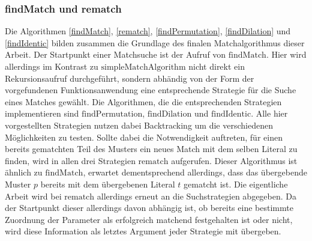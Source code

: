 \subsubsection{findMatch und rematch}
Die Algorithmen \ref{findMatch}, \ref{rematch}, \ref{findPermutation}, \ref{findDilation} und \ref{findIdentic} bilden zusammen die Grundlage des finalen Matchalgorithmus dieser Arbeit. Der Startpunkt einer Matchsuche ist der Aufruf von $\mathrm{findMatch}$. Hier wird allerdings im Kontrast zu $\mathrm{simpleMatchAlgorithm}$ nicht direkt ein Rekursionsaufruf durchgeführt, sondern abhändig von der Form der vorgefundenen Funktionsanwendung eine entsprechende Strategie für die Suche eines Matches gewählt. Die Algorithmen, die die entsprechenden Strategien implementieren sind $\mathrm{findPermutation}$, $\mathrm{findDilation}$ und $\mathrm{findIdentic}$. Alle hier vorgestellten Strategien nutzen dabei Backtracking um die verschiedenen Möglichkeiten zu testen. Sollte dabei die Notwendigkeit auftreten, für einen bereits gematchten Teil des Musters ein neues Match mit dem selben Literal zu finden, wird in allen drei Strategien $\mathrm{rematch}$ aufgerufen. Dieser Algorithmus ist ähnlich zu $\mathrm{findMatch}$, erwartet dementsprechend allerdings, dass das übergebende Muster $p$ bereits mit dem übergebenen Literal $t$ gematcht ist. Die eigentliche Arbeit wird bei $\mathrm{rematch}$ allerdings erneut an die Suchstrategien abgegeben. Da der Startpunkt dieser allerdings davon abhängig ist, ob bereits eine bestimmte Zuordnung der Parameter als erfolgreich matchend festgehalten ist oder nicht, wird diese Information als letztes Argument jeder Strategie mit übergeben.

 
\begin{algorithm}
\DontPrintSemicolon
\caption{$\mathrm{findMatch} \colon M \times T \rightarrow \mathit{Bool}$}\label{findMatch}

 {
}
\end{algorithm}

